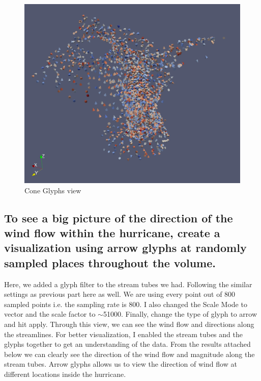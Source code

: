 \documentclass[a4paper,11pt]{article}
\theoremstyle{mytheor}
\begin{document}
\clearpage
\begin{figure}[!h]
    \centering
    \includegraphics[scale = 0.8]{Figures/P2_3_3.PNG}
    \caption{Cone Glyphs view}
    \label{p2_4}
\end{figure}

\clearpage
\subsection{To see a big picture of the direction of the wind flow within the hurricane, create a visualization using arrow glyphs at randomly sampled places throughout the volume. }
Here, we added a glyph filter to the stream tubes we had. Following the similar settings as previous part here as well. We are using every point out of 800 sampled points i.e. the sampling rate is 800. I also changed the Scale Mode to vector and the scale factor to $\sim$51000. Finally, change the type of glyph to arrow and hit apply. Through this view, we can see the wind flow and directions along the streamlines. For better visualization, I enabled the stream tubes and the glyphs together to get an understanding of the data. From the results attached below we can clearly see the direction of the wind flow and magnitude along the stream tubes. Arrow glyphs allows us to view the direction of wind flow at different locations inside the hurricane. 
\end{document}
